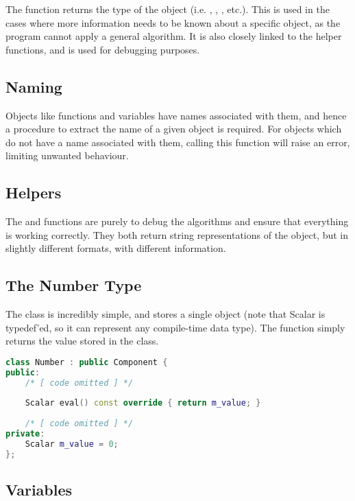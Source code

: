 \documentclass[12pt]{article}
\begin{document}
The  function returns the type of the object (i.e. , , , etc.). This is used in the cases where more information needs to be known about a specific object, as the program cannot apply a general algorithm. It is also closely linked to the helper functions, and is used for debugging purposes.

\subsection{Naming}

Objects like functions and variables have names associated with them, and hence a procedure to extract the name of a given object is required. For objects which do not have a name associated with them, calling this function will raise an error, limiting unwanted behaviour.

\subsection{Helpers}

The  and  functions are purely to debug the algorithms and ensure that everything is working correctly. They both return string representations of the object, but in slightly different formats, with different information.

\subsection{The Number Type}

The  class is incredibly simple, and stores a single  object (note that Scalar is typedef'ed, so it can represent any compile-time data type). The  function simply returns the value stored in the class.

\begin{lstlisting}[language=C++]
class Number : public Component {
public:
	/* [ code omitted ] */
	
	Scalar eval() const override { return m_value; }
	
	/* [ code omitted ] */
private:
	Scalar m_value = 0;
};
\end{lstlisting}

\subsection{Variables}
\end{document}
